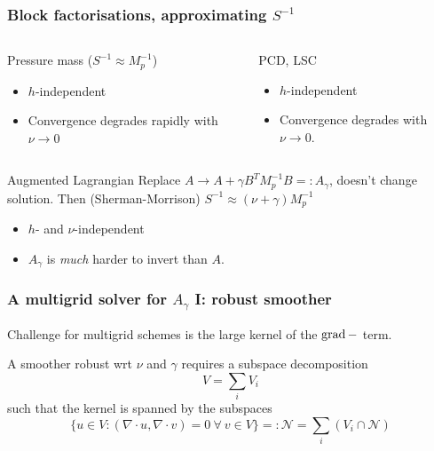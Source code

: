 \documentclass[presentation]{beamer}
\newcommand{\cmark}{\ding{51}}
\newcommand{\xmark}{\ding{55}}
\DeclareMathOperator{\grad}{grad}
\let\div\relax
\DeclareMathOperator{\div}{div}
\begin{document}
\begin{frame}
  \frametitle{Block factorisations, approximating $S^{-1}$}
  \begin{columns}[t]
    \begin{column}{0.48\textwidth}
      \begin{block}{Pressure mass ($S^{-1} \approx M_p^{-1}$)}
        \begin{itemize}
        \item[\cmark] $h$-independent
        \item[\xmark] Convergence degrades rapidly with $\nu \to 0$
        \end{itemize}
      \end{block}
    \end{column}
    \begin{column}{0.48\textwidth}
      \begin{block}{PCD, LSC}
        \begin{itemize}
        \item[\cmark] $h$-independent
        \item[\xmark] Convergence degrades with $\nu \to 0$.
        \end{itemize}
      \end{block}
    \end{column}
  \end{columns}
  \begin{block}{Augmented Lagrangian}
    Replace $A \to A + \gamma B^T M_p^{-1}B =: A_\gamma$, doesn't
    change solution.  Then (Sherman-Morrison)
    $S^{-1} \approx (\nu + \gamma)M_p^{-1}$
    \begin{itemize}
    \item[\cmark] $h$- and $\nu$-independent
    \item[\xmark] $A_\gamma$ is \emph{much} harder to invert than $A$.
    \end{itemize}
  \end{block}
\end{frame}

\begin{frame}
  \frametitle{A multigrid solver for $A_\gamma$ I: robust smoother}
  Challenge for multigrid schemes is the large kernel of the
  $\grad-\div$ term.

  \begin{theorem}
    A smoother robust wrt $\nu$ and $\gamma$ requires a subspace
    decomposition
  \begin{equation*}
    V = \sum_i V_i
  \end{equation*}
  such that the kernel is spanned by the subspaces
  \begin{equation*}
    \{u \in V : (\nabla \cdot u, \nabla \cdot v) =
    0 \ \forall\ v \in V\} =: \mathcal{N} = \sum_i \left(V_i \cap \mathcal{N} \right)
  \end{equation*}
  \end{theorem}
\end{frame}
\end{document}
